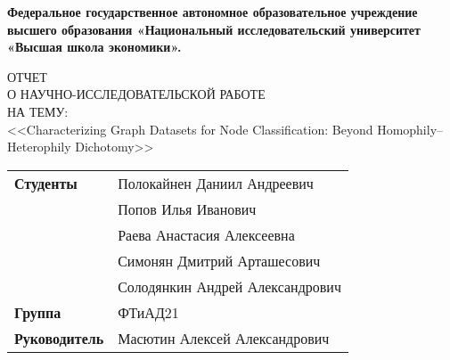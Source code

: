 \begin{titlepage}

    \begin{center}
        \textbf{Федеральное государственное автономное образовательное
        	учреждение высшего образования 
        	«Национальный исследовательский университет 
        	«Высшая школа экономики».
        }
    
	\end{center}

\vfill
	
	\begin{center}

        ОТЧЕТ \\
        	О НАУЧНО-ИССЛЕДОВАТЕЛЬСКОЙ РАБОТЕ \\
        	НА ТЕМУ:\\
        	<<Characterizing Graph Datasets for Node Classification:
        	Beyond Homophily–Heterophily Dichotomy>>
        


    \end{center}

    \vfill


    

        \vspace{2ex}

        \begin{table}[H]
        	\begin{flushright}
        	\begin{tabular}{ll}
        		\textbf{Студенты}     & Полокайнен Даниил Андреевич     \\
        		& Попов Илья Иванович             \\
        		& Раева Анастасия Алексеевна      \\
        		& Симонян Дмитрий Арташесович     \\
        		& Солодянкин Андрей Александрович \\
        		\textbf{Группа}       & ФТиАД21                         \\
        		\textbf{Руководитель} & Масютин Алексей Александрович  
        	\end{tabular}
        \end{flushright}
        \end{table}


\end{titlepage}
